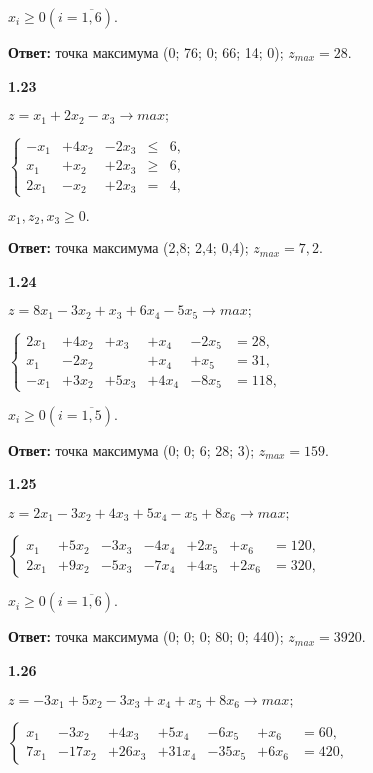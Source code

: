 \documentclass[10pt, a5paper, twoside]{article} %
\begin{document}
$x_i \geq 0 (i = \overline{1,6}).$

\textbf{Ответ: } точка максимума (0; 76; 0; 66; 14; 0); $z_{max} = 28.$

\textbf{1.23}

$z=x_1 + 2x_2 - x_3\rightarrow max;$

$
\left\{
\begin{array}{ccccc}
-x_1  &+4x_2 &-2x_3  &\leq &6, \\
x_1   &+x_2  &+2x_3  &\geq &6, \\
2x_1  &-x_2  &+2x_3  &=    &4,
\end{array}
\right.
$

$x_1, z_2, x_3 \geq 0.$

\textbf{Ответ: } точка максимума (2,8; 2,4; 0,4); $z_{max} = 7,2.$

\textbf{1.24}

$z=8x_1 - 3x_2 + x_3 + 6x_4 - 5x_5\rightarrow max;$

$
\left\{
\begin{array}{cccccc}
2x_1  &+4x_2  &+x_3   &+x_4   &-2x_5  &=28, \\
x_1   &-2x_2  &       &+x_4   &+x_5   &=31, \\
-x_1  &+3x_2  &+5x_3  &+4x_4  &-8x_5  &=118,
\end{array}
\right.
$

$x_i \geq 0 (i = \overline{1,5}).$

\textbf{Ответ: } точка максимума (0; 0; 6; 28; 3); $z_{max} = 159.$

\textbf{1.25}

$z=2x_1 - 3x_2 + 4x_3 + 5x_4 - x_5 + 8x_6\rightarrow max;$

$
\left\{
\begin{array}{ccccccc}
x_1   &+5x_2  &-3x_3   &-4x_4   &+2x_5   &+x_6   &=120, \\
2x_1  &+9x_2  &-5x_3   &-7x_4   &+4x_5   &+2x_6  &=320,
\end{array}
\right.
$

$x_i \geq 0 (i = \overline{1,6}).$

\textbf{Ответ: } точка максимума (0; 0; 0; 80; 0; 440); $z_{max} = 3920.$

\textbf{1.26}

$z=-3x_1 + 5x_2 - 3x_3 + x_4 + x_5 + 8x_6\rightarrow max;$

$
\left\{
\begin{array}{ccccccc}
x_1    &-3x_2   &+4x_3    &+5x_4    &-6x_5   &+x_6   &=60, \\
7x_1   &-17x_2  &+26x_3   &+31x_4   &-35x_5  &+6x_6  &=420,
\end{array}
\right.
$
\end{document}
